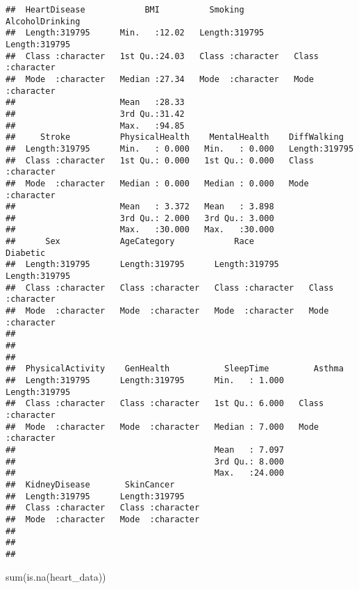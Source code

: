 \documentclass[
]{article}
\newenvironment{Shaded}{\begin{snugshade}}{\end{snugshade}}
\newcommand{\FunctionTok}[1]{\textcolor[rgb]{0.00,0.00,0.00}{#1}}
\newcommand{\NormalTok}[1]{#1}
\begin{document}
\begin{verbatim}
##  HeartDisease            BMI          Smoking          AlcoholDrinking   
##  Length:319795      Min.   :12.02   Length:319795      Length:319795     
##  Class :character   1st Qu.:24.03   Class :character   Class :character  
##  Mode  :character   Median :27.34   Mode  :character   Mode  :character  
##                     Mean   :28.33                                        
##                     3rd Qu.:31.42                                        
##                     Max.   :94.85                                        
##     Stroke          PhysicalHealth    MentalHealth    DiffWalking       
##  Length:319795      Min.   : 0.000   Min.   : 0.000   Length:319795     
##  Class :character   1st Qu.: 0.000   1st Qu.: 0.000   Class :character  
##  Mode  :character   Median : 0.000   Median : 0.000   Mode  :character  
##                     Mean   : 3.372   Mean   : 3.898                     
##                     3rd Qu.: 2.000   3rd Qu.: 3.000                     
##                     Max.   :30.000   Max.   :30.000                     
##      Sex            AgeCategory            Race             Diabetic        
##  Length:319795      Length:319795      Length:319795      Length:319795     
##  Class :character   Class :character   Class :character   Class :character  
##  Mode  :character   Mode  :character   Mode  :character   Mode  :character  
##                                                                             
##                                                                             
##                                                                             
##  PhysicalActivity    GenHealth           SleepTime         Asthma         
##  Length:319795      Length:319795      Min.   : 1.000   Length:319795     
##  Class :character   Class :character   1st Qu.: 6.000   Class :character  
##  Mode  :character   Mode  :character   Median : 7.000   Mode  :character  
##                                        Mean   : 7.097                     
##                                        3rd Qu.: 8.000                     
##                                        Max.   :24.000                     
##  KidneyDisease       SkinCancer       
##  Length:319795      Length:319795     
##  Class :character   Class :character  
##  Mode  :character   Mode  :character  
##                                       
##                                       
## 
\end{verbatim}

\begin{Shaded}
\begin{Highlighting}[]
\FunctionTok{sum}\NormalTok{(}\FunctionTok{is.na}\NormalTok{(heart\_data))}
\end{Highlighting}
\end{Shaded}
\end{document}
